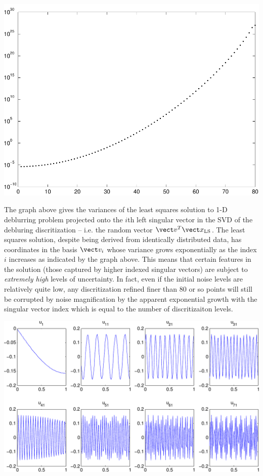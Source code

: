 \documentclass{homework}
\begin{document}
\begin{longproblem}
\begin{solution}
\begin{center}
\includegraphics[width=.4\textwidth]{variances.pdf}
\end{center}
The graph above gives the variances of the least squares solution to 1-D deblurring problem projected onto the $i$th left singular vector in the SVD of the debluring discritization -- i.e. the random vector $\vect v^T\vect x_{\mathrm{LS}}$.  The least squares solution, despite being derived from identically distributed data, has coordinates in the basis $\vect v_i$ whose variance grows exponentially as the index $i$ increases as indicated by the graph above.  This means that certain features in the solution (those captured by higher indexed singular vectors) are subject to \emph{extremely high} levels of uncertainty.  In fact, even if the initial noise levels are relatively quite low, any discritization refined finer than 80 or so points will still be corrupted by noise magnification by the apparent exponential growth with the singular vector index which is equal to the number of discritizaiton levels.
\end{solution}

\newpage
{}

\includegraphics[width=.8\textwidth]{oscillation2.pdf}


\end{longproblem}
\end{document}
